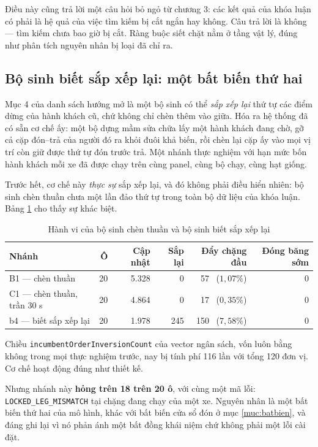 Điều này cũng trả lời một câu hỏi bỏ ngỏ từ chương 3: các kết quả của khóa luận có phải là hệ
quả của việc tìm kiếm bị cắt ngắn hay không. Câu trả lời là không --- tìm kiếm chưa bao giờ bị
cắt. Ràng buộc siết chặt nằm ở tầng vật lý, đúng như phân tích nguyên nhân bị loại đã chỉ ra.

\subsection{Bộ sinh biết sắp xếp lại: một bất biến thứ hai}

Mục 4 của danh sách hướng mở là một bộ sinh có thể \emph{sắp xếp lại} thứ tự các điểm dừng của
hành khách cũ, chứ không chỉ chèn thêm vào giữa. Hóa ra hệ thống đã có sẵn cơ chế ấy: một bộ
dựng mầm sửa chữa lấy một hành khách đang chờ, gỡ cả cặp đón--trả của người đó ra khỏi đuôi khả
biến, rồi chèn lại cặp ấy vào mọi vị trí còn giữ được thứ tự đón trước trả. Một nhánh thực
nghiệm với hạn mức bốn hành khách mỗi xe đã được chạy trên cùng panel, cùng bộ chạy, cùng hạt
giống.

Trước hết, cơ chế này \emph{thực sự} sắp xếp lại, và đó không phải điều hiển nhiên: bộ sinh chèn
thuần chưa một lần đảo thứ tự trong toàn bộ dữ liệu của khóa luận. Bảng \ref{bang:sapxep} cho
thấy sự khác biệt.

\begin{table}[htbp]
\centering
\caption{Hành vi của bộ sinh chèn thuần và bộ sinh biết sắp xếp lại}
\label{bang:sapxep}
\small
\begin{tabular}{@{}lrrrrr@{}}
\toprule
\textbf{Nhánh} & \textbf{Ô} & \textbf{Cập nhật} & \textbf{Sắp lại} & \textbf{Đẩy chặng đầu} & \textbf{Đóng băng sớm}\\
\midrule
B1 --- chèn thuần & 20 & 5.328 & 0 & 57 \ ($1{,}07\%$) & 0\\
C1 --- chèn thuần, trần 30 s & 20 & 4.864 & 0 & 17 \ ($0{,}35\%$) & 0\\
b4 --- biết sắp xếp lại & 20 & 1.978 & 245 & 150 \ ($7{,}58\%$) & 0\\
\bottomrule
\end{tabular}
\end{table}

Chiều \texttt{incumbentOrderInversionCount} của vector ngân sách, vốn luôn bằng không trong mọi
thực nghiệm trước, nay bị tính phí 116 lần với tổng 120 đơn vị. Cơ chế hoạt động đúng như thiết
kế.

Nhưng nhánh này \textbf{hỏng trên 18 trên 20 ô}, với cùng một mã lỗi:
\texttt{LOCKED\_LEG\_MISMATCH} tại chặng đang chạy của một xe. Nguyên nhân là một bất biến thứ
hai của mô hình, khác với bất biến cửa sổ đón ở mục \ref{muc:batbien}, và đáng ghi lại vì nó
phản ánh một bất đồng khái niệm chứ không phải một lỗi cài đặt.

